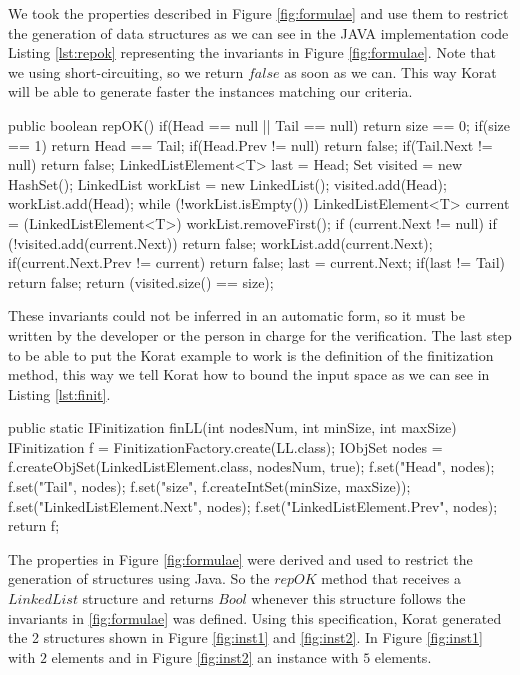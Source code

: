 \begin{code}
We took the properties described in Figure \ref{fig:formulae} and use them to restrict the generation of data structures
as we can see in the JAVA implementation code Listing \ref{lst:repok} representing the invariants in Figure \ref{fig:formulae}.
Note that we using short-circuiting, so we return $false$ as soon as we can. This way Korat will be able to generate faster the instances matching our criteria.

\begin{code}[{repOK Korat method for LinkedList class in JAVA},label=lst:repok]
public boolean repOK() {
  if(Head == null || Tail == null)
    return size == 0;
  if(size == 1) return Head == Tail;
  if(Head.Prev != null) return false;
  if(Tail.Next != null) return false;
  LinkedListElement<T> last = Head;
  Set visited = new HashSet();
  LinkedList workList = new LinkedList();
  visited.add(Head);
  workList.add(Head);
  while (!workList.isEmpty()) {
    LinkedListElement<T> current = (LinkedListElement<T>) workList.removeFirst();
    if (current.Next != null) {
      if (!visited.add(current.Next))
	    return false;
      workList.add(current.Next);
      if(current.Next.Prev != current) return false;
      last = current.Next;
    }
  }
  if(last != Tail)
    return false;
  return (visited.size() == size);
}
\end{code}

These invariants could not be inferred in an automatic form, so it must be written by the developer or the person in charge for the verification.
The last step to be able to put the Korat example to work is the definition of the finitization method, this way we tell Korat how to bound the input space as 
we can see in Listing \ref{lst:finit}.

\begin{code}[{Finitization Korat method for LinkedList class in JAVA},label=lst:finit]
public static IFinitization finLL(int nodesNum, int minSize, int maxSize) {
  IFinitization f = FinitizationFactory.create(LL.class);
  IObjSet nodes = f.createObjSet(LinkedListElement.class, nodesNum, true);
  f.set("Head", nodes);
  f.set("Tail", nodes);
  f.set("size", f.createIntSet(minSize, maxSize));
  f.set("LinkedListElement.Next", nodes);
  f.set("LinkedListElement.Prev", nodes);
  return f;
}
\end{code}

The properties in Figure \ref{fig:formulae} were derived and used to restrict the generation of structures using Java. So the $repOK$ method that receives
a $LinkedList$ structure and returns $Bool$ whenever this structure follows the invariants in \ref{fig:formulae} was defined.
Using this specification, Korat generated the 2 structures shown in Figure \ref{fig:inst1} and \ref{fig:inst2}. In Figure \ref{fig:inst1} with $2$ elements
and in Figure \ref{fig:inst2} an instance with $5$ elements.


\end{code}
